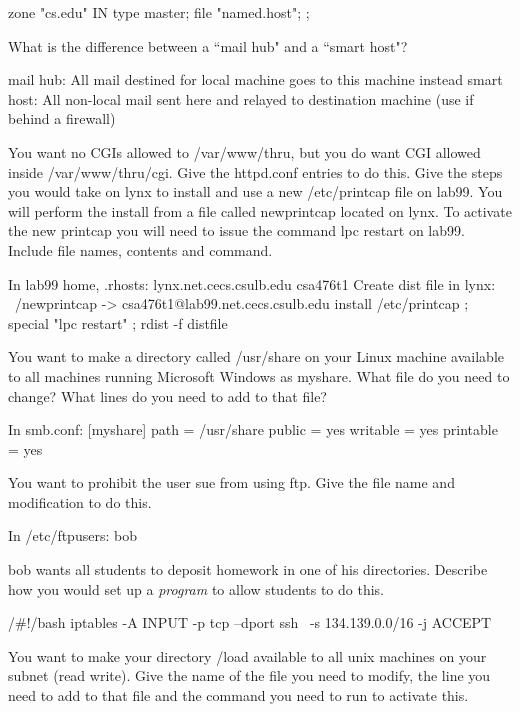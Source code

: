zone "cs.edu" IN {
     type master;
     file "named.host";
};

What is the difference between a ``mail hub" and a ``smart host"?
\vskip 1.2in
\ques

mail hub:
All mail destined for local machine goes to this machine instead
smart host:
All non-local mail sent here and relayed to destination machine
(use if behind a firewall)

You want no CGIs allowed to {\ltt{}/var/www/thru},
but you do want CGI allowed inside {\ltt{}/var/www/thru/cgi}.
Give the {\ltt{}httpd.conf} entries to do this.
\vskip 1.8in
\ques
Give the steps you would take on {\ltt{}lynx} to install and use
a new {\ltt{}/etc/printcap} file on {\ltt{}lab99}.
You will perform the install from a file called {\ltt{}newprintcap}
located on {\ltt{}lynx}.
To activate the new printcap you will need to issue the command
{\ltt{}lpc restart} on {\ltt{}lab99}.
Include file names, contents and command.
\vskip 2.0in
\ques

In lab99 home, .rhosts:
lynx.net.cecs.csulb.edu csa476t1
Create dist file in lynx:
~/newprintcap -> csa476t1@lab99.net.cecs.csulb.edu
       install /etc/printcap ;
       special "lpc restart" ;
rdist -f distfile

You want to make a directory called {\ltt{}/usr/share} on your
Linux machine available to all machines running Microsoft Windows as
{\ltt{}myshare}.
What file do you need to change?
What lines do you need to add to that file?
\vskip 1.2in
\vfill\eject
\ques

In smb.conf:
[myshare]
  path = /usr/share
  public = yes
  writable = yes
  printable = yes

You want to prohibit the user {\ltt{}sue} from using ftp.
Give the file name and modification to do this.
\vskip 1.0in
\ques

In /etc/ftpusers:
bob

{\ltt{}bob} wants all students to deposit homework in one of his
directories.
Describe how you would set up a {\it program} to allow students to do this.
\vskip 1.3in
\ques

/#!/bash
iptables -A INPUT -p tcp --dport ssh \
       -s 134.139.0.0/16 -j ACCEPT

You want to make your directory
{\ltt{}/load}
available to all unix machines on your subnet (read write).
Give the name of the file you need to modify, the line you need to
add to that file and the command you need to run to activate this.
\vskip 1.0in
\ques

